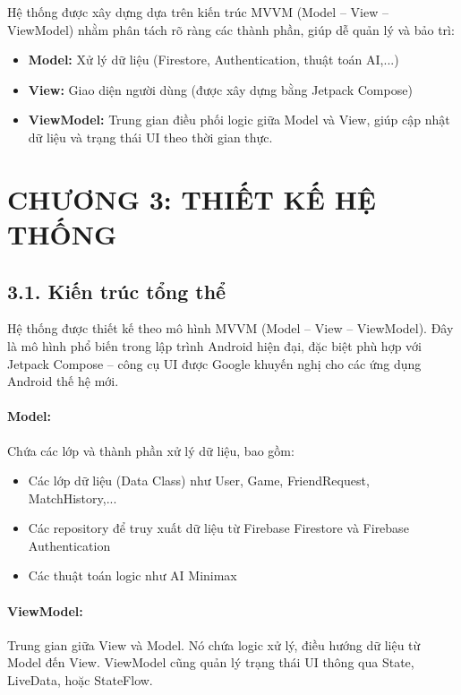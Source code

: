 \documentclass[a4paper,12pt]{article}
\begin{document}
\justify
\noindent Hệ thống được xây dựng dựa trên kiến trúc MVVM (Model – View – ViewModel) nhằm phân tách rõ ràng các thành phần, giúp dễ quản lý và bảo trì:
\begin{itemize}[label=·]
    \item \textbf{Model:} Xử lý dữ liệu (Firestore, Authentication, thuật toán AI,...)
    \item \textbf{View:} Giao diện người dùng (được xây dựng bằng Jetpack Compose)
    \item \textbf{ViewModel:} Trung gian điều phối logic giữa Model và View, giúp cập nhật dữ liệu và trạng thái UI theo thời gian thực.
\end{itemize}

\section*{\centering \textbf{CHƯƠNG 3: THIẾT KẾ HỆ THỐNG}} %

\subsection*{3.1. Kiến trúc tổng thể} %

\justify
\noindent Hệ thống được thiết kế theo mô hình MVVM (Model – View – ViewModel). Đây là mô hình phổ biến trong lập trình Android hiện đại, đặc biệt phù hợp với Jetpack Compose – công cụ UI được Google khuyến nghị cho các ứng dụng Android thế hệ mới.

\paragraph{Model:} %
\noindent Chứa các lớp và thành phần xử lý dữ liệu, bao gồm:
\begin{itemize}[label=·]
    \item Các lớp dữ liệu (Data Class) như User, Game, FriendRequest, MatchHistory,...
    \item Các repository để truy xuất dữ liệu từ Firebase Firestore và Firebase Authentication
    \item Các thuật toán logic như AI Minimax
\end{itemize}

\paragraph{ViewModel:} %
\noindent Trung gian giữa View và Model. Nó chứa logic xử lý, điều hướng dữ liệu từ Model đến View. ViewModel cũng quản lý trạng thái UI thông qua State, LiveData, hoặc StateFlow.
\end{document}
